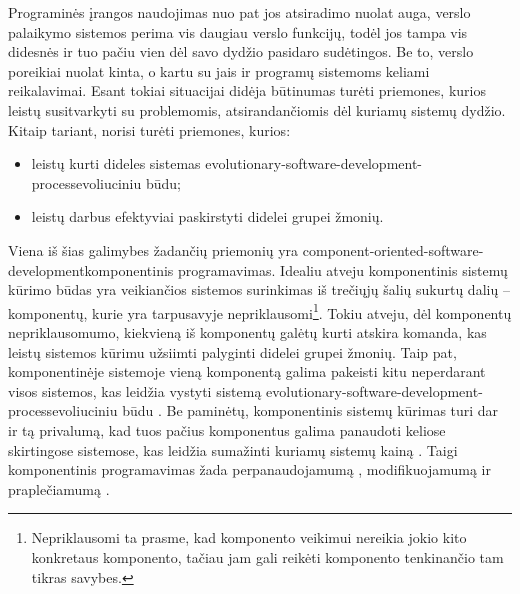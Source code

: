 

Programinės įrangos naudojimas nuo pat jos atsiradimo nuolat auga,
verslo palaikymo sistemos perima vis daugiau verslo funkcijų, todėl
jos tampa vis didesnės ir tuo pačiu vien dėl savo dydžio pasidaro
sudėtingos. Be to, verslo poreikiai nuolat kinta, o kartu su jais
ir programų sistemoms keliami reikalavimai. Esant tokiai situacijai
didėja būtinumas turėti priemones, kurios leistų susitvarkyti
su problemomis, atsirandančiomis dėl kuriamų sistemų dydžio. Kitaip
tariant, norisi turėti priemones, kurios:
\begin{itemize}
  \item leistų kurti dideles sistemas
    \gls{evolutionary-software-development-process}{evoliuciniu būdu};
  \item leistų darbus efektyviai paskirstyti didelei grupei žmonių.
\end{itemize}

Viena iš šias galimybes žadančių priemonių yra
\gls{component-oriented-software-development}{komponentinis programavimas}.
Idealiu atveju komponentinis sistemų kūrimo būdas yra veikiančios
sistemos surinkimas iš trečiųjų šalių sukurtų dalių –
komponentų, kurie yra tarpusavyje
nepriklausomi\footnote{Nepriklausomi ta prasme, kad komponento veikimui
nereikia jokio kito konkretaus komponento, tačiau jam gali reikėti
komponento tenkinančio tam tikras savybes.}.
Tokiu atveju, dėl komponentų nepriklausomumo, kiekvieną iš
komponentų galėtų kurti atskira komanda, kas leistų sistemos kūrimu
užsiimti palyginti didelei grupei žmonių. Taip pat, komponentinėje
sistemoje vieną komponentą galima pakeisti kitu neperdarant visos
sistemos, kas leidžia vystyti sistemą
\gls{evolutionary-software-development-process}{evoliuciniu būdu}%
\cite[6]{cs-beyond-object-oriented-programming}. Be paminėtų,
komponentinis sistemų kūrimas turi dar ir tą privalumą, kad tuos
pačius komponentus galima panaudoti keliose skirtingose sistemose, kas
leidžia sumažinti kuriamų sistemų
kainą \cite[6]{cs-beyond-object-oriented-programming}. Taigi
komponentinis programavimas žada perpanaudojamumą ,
modifikuojamumą  ir praplečiamumą 
\cites{what-to-compose}{point-counterpoint}.

